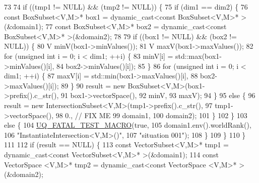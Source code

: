 \begin{DoxyCode}
73 
74     \textcolor{keywordflow}{if} ((tmp1 != NULL) && (tmp2 != NULL)) \{
75       \textcolor{keywordflow}{if} (dim1 == dim2) \{
76         \textcolor{keyword}{const} BoxSubset<V,M>* box1 = \textcolor{keyword}{dynamic\_cast<}\textcolor{keyword}{const }BoxSubset<V,M>* \textcolor{keyword}{>}(&domain1);
77         \textcolor{keyword}{const} BoxSubset<V,M>* box2 = \textcolor{keyword}{dynamic\_cast<}\textcolor{keyword}{const }BoxSubset<V,M>* \textcolor{keyword}{>}(&domain2);
78 
79         \textcolor{keywordflow}{if} ((box1 != NULL) && (box2 != NULL)) \{
80           V minV(box1->minValues());
81           V maxV(box1->maxValues());
82           \textcolor{keywordflow}{for} (\textcolor{keywordtype}{unsigned} \textcolor{keywordtype}{int} i = 0; i < dim1; ++i) \{
83             minV[i] = std::max(box1->minValues()[i],
84                                box2->minValues()[i]);
85           \}
86           \textcolor{keywordflow}{for} (\textcolor{keywordtype}{unsigned} \textcolor{keywordtype}{int} i = 0; i < dim1; ++i) \{
87             maxV[i] = std::min(box1->maxValues()[i],
88                                box2->maxValues()[i]);
89           \}
90           result = \textcolor{keyword}{new} BoxSubset<V,M>(box1->prefix().c\_str(),
91                                              box1->vectorSpace(),
92                                              minV,
93                                              maxV);
94         \}
95         \textcolor{keywordflow}{else} \{
96           result = \textcolor{keyword}{new} IntersectionSubset<V,M>(tmp1->prefix().c\_str(),
97                                                       tmp1->vectorSpace(),
98                                                       0., \textcolor{comment}{// FIX ME}
99                                                       domain1,
100                                                       domain2);
101         \}
102       \}
103       \textcolor{keywordflow}{else} \{
104         \hyperlink{_defines_8h_a56d63d18d0a6d45757de47fcc06f574d}{UQ\_FATAL\_TEST\_MACRO}(\textcolor{keyword}{true},
105                             domain1.env().worldRank(),
106                             \textcolor{stringliteral}{"InstantiateIntersection<V,M>()"},
107                             \textcolor{stringliteral}{"situation 001"});
108       \}
109     \}
110   \}
111 
112   \textcolor{keywordflow}{if} (result == NULL) \{
113     \textcolor{keyword}{const} VectorSubset<V,M>* tmp1 = \textcolor{keyword}{dynamic\_cast<}\textcolor{keyword}{const }VectorSubset<V,M>* \textcolor{keyword}{>}(&domain1);
114     \textcolor{keyword}{const} VectorSpace <V,M>* tmp2 = \textcolor{keyword}{dynamic\_cast<}\textcolor{keyword}{const }VectorSpace <V,M>* \textcolor{keyword}{>}(&domain2);

\end{DoxyCode}
